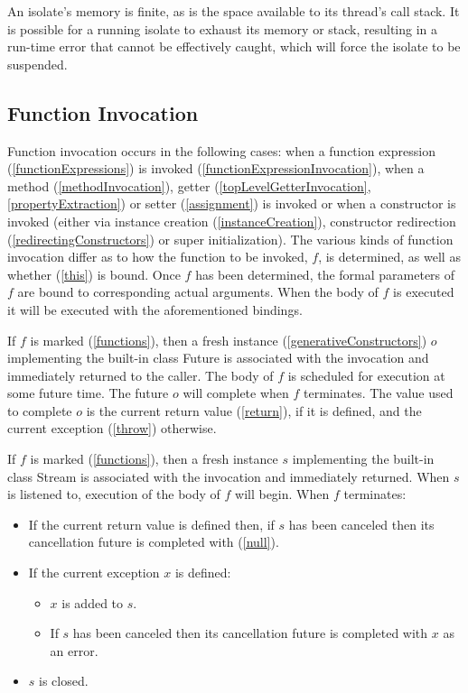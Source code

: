 \documentclass{article}
\newcommand{\code}[1]{{\sf #1}}
\begin{document}
\LMHash{}
An isolate's memory is finite, as is the space available to its thread's call stack. It is possible for a running isolate to exhaust its memory or stack, resulting in a run-time error that cannot be effectively caught, which will force the isolate to be suspended.




\subsection{ Function Invocation}
 
\LMHash{}
Function invocation occurs in the following cases: when a function expression  (\ref{functionExpressions}) is invoked (\ref{functionExpressionInvocation}), when a method (\ref{methodInvocation}), getter (\ref{topLevelGetterInvocation}, \ref{propertyExtraction}) or setter (\ref{assignment}) is invoked or when a constructor is invoked (either via instance creation (\ref{instanceCreation}), constructor redirection (\ref{redirectingConstructors}) or super initialization). The various kinds of function invocation differ as to how the function to be invoked, $f$,  is determined, as well as whether \THIS{} (\ref{this}) is bound. Once $f$ has been determined, the formal parameters of $f$ are bound to corresponding actual arguments. When the body of $f$ is executed it will be executed with the aforementioned bindings. 

\LMHash{}
If $f$ is marked \ASYNC{} (\ref{functions}), then a fresh instance (\ref{generativeConstructors}) $o$ implementing the built-in class \code{Future} is associated with the invocation and immediately returned to the caller. The body of $f$ is scheduled for execution at some future time. The future $o$ will complete when $f$ terminates. The value used to complete $o$ is the current return value (\ref{return}), if it is defined, and the current exception (\ref{throw}) otherwise. 

\LMHash{}
If $f$ is marked \ASYNC* (\ref{functions}), then a fresh instance $s$ implementing the built-in class \code{Stream} is associated with the invocation and immediately returned. When $s$ is listened to, execution of the body of $f$ will begin.  When $f$ terminates:
\begin{itemize}
\item If the current return value is defined then, if $s$ has been canceled then its cancellation future is completed with \NULL{} (\ref{null}). 
\item If the current exception $x$ is defined:
  \begin{itemize}
  \item $x$ is added to $s$. 
  \item If $s$ has been canceled then its cancellation future is completed with $x$ as an error.
  \end{itemize}
\item $s$ is closed.
\end{itemize}
\end{document}
